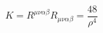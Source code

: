 \begin{equation}
K = R^{\mu\nu\alpha\beta} R_{\mu\nu\alpha\beta} = \frac{48}{\rho^4}
\end{equation}

